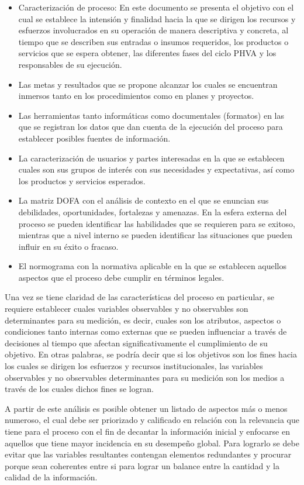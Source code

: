 \documentclass[
]{book}
\begin{document}
\begin{itemize}
\item
  Caracterización de proceso: En este documento se presenta el objetivo con el cual se establece la intensión y finalidad hacia la que se dirigen los recursos y esfuerzos involucrados en su operación de manera descriptiva y concreta, al tiempo que se describen sus entradas o insumos requeridos, los productos o servicios que se espera obtener, las diferentes fases del ciclo PHVA y los responsables de su ejecución.
\item
  Las metas y resultados que se propone alcanzar los cuales se encuentran inmersos tanto en los procedimientos como en planes y proyectos.
\item
  Las herramientas tanto informáticas como documentales (formatos) en las que se registran los datos que dan cuenta de la ejecución del proceso para establecer posibles fuentes de información.
\item
  La caracterización de usuarios y partes interesadas en la que se establecen cuales son sus grupos de interés con sus necesidades y expectativas, así como los productos y servicios esperados.
\item
  La matriz DOFA con el análisis de contexto en el que se enuncian sus debilidades, oportunidades, fortalezas y amenazas. En la esfera externa del proceso se pueden identificar las habilidades que se requieren para se exitoso, mientras que a nivel interno se pueden identificar las situaciones que pueden influir en su éxito o fracaso.
\item
  El normograma con la normativa aplicable en la que se establecen aquellos aspectos que el proceso debe cumplir en términos legales.
\end{itemize}

Una vez se tiene claridad de las características del proceso en particular, se requiere establecer cuales variables observables y no observables son determinantes para su medición, es decir, cuales son los atributos, aspectos o condiciones tanto internas como externas que se pueden influenciar a través de decisiones al tiempo que afectan significativamente el cumplimiento de su objetivo. En otras palabras, se podría decir que si los objetivos son los fines hacia los cuales se dirigen los esfuerzos y recursos institucionales, las variables observables y no observables determinantes para su medición son los medios a través de los cuales dichos fines se logran.

A partir de este análisis es posible obtener un listado de aspectos más o menos numeroso, el cual debe ser priorizado y calificado en relación con la relevancia que tiene para el proceso con el fin de decantar la información inicial y enfocarse en aquellos que tiene mayor incidencia en su desempeño global. Para lograrlo se debe evitar que las variables resultantes contengan elementos redundantes y procurar porque sean coherentes entre si para lograr un balance entre la cantidad y la calidad de la información.
\end{document}
